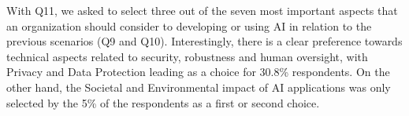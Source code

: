 \documentclass{article}
\begin{document}
With Q11, we asked to select three out of the seven most important aspects that an organization should consider to developing or using AI in relation to the previous scenarios (Q9 and Q10).
Interestingly, there is a clear preference towards technical aspects related to security, robustness and human oversight, with Privacy and Data Protection leading as a choice for 30.8\% respondents. On the other hand, the Societal and Environmental impact of AI applications was only selected by the 5\% of the respondents as a first or second choice. 

\end{document}
